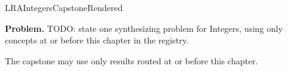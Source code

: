 \ifcsname LRAIntegersCapstoneRendered\endcsname
\else
\expandafter\gdef\csname LRAIntegersCapstoneRendered\endcsname{}

\newpage
{}
\label{cap:integers}

\begin{tcolorbox}[
  colback=gray!6,
  colframe=gray!40,
  arc=2pt,
  left=8pt, right=8pt, top=6pt, bottom=6pt,
  title={\small\textbf{Capstone Problem}},
  fonttitle=\small\bfseries
]
\textbf{Problem.}
TODO: state one synthesizing problem for Integers, using only concepts at or
before this chapter in the registry.
\end{tcolorbox}

\begin{remark*}
The capstone may use only results routed at or before this chapter.
\end{remark*}

\clearpage
\fi
